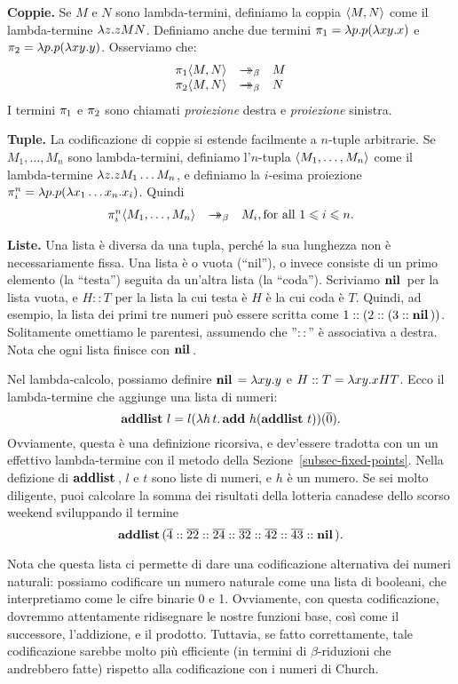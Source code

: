 \documentclass{article}
\begin{document}
{\bf Coppie.} Se $M$ e $N$ sono lambda-termini, definiamo la coppia
$\langle M,N\rangle$ come il lambda-termine $\lambda z.zMN$. Definiamo anche due
termini $\pi_1=\lambda p.p(\lambda xy.x)$ e $\pi_2=\lambda p.p(\lambda xy.y)$.
Osserviamo che:
\[  \begin{array}{rcl}
  \leftt \pair{M,N} &\redbs& M \\
  \rightt \pair{M,N} &\redbs& N
\end{array}
\]
I termini $\pi_1$ e $\pi_2$ sono chiamati {\em proiezione} destra e
{\em proiezione} sinistra.

{\bf Tuple.} La codificazione di coppie si estende facilmente a $n$-tuple
arbitrarie. Se $M_1,\ldots,M_n$ sono lambda-termini, definiamo l'$n$-tupla
$\langle M_1,\ldots,M_n\rangle$ come il lambda-termine $\lambda z.zM_1\ldots M_n$,
e definiamo la $i$-esima proiezione $\pi^n_i=\lambda p.p(\lambda x_1\ldots
x_n.x_i)$. Quindi
\[ \begin{array}{rcl}
  \pi^n_i\langle M_1,\ldots,M_n\rangle &\mathrel{\rightarrow\!\!\!\!\!\rightarrow}_{\beta}& M_i, \mbox{for all $1\leqslant i\leqslant n$.}
\end{array}
\]

{\bf Liste.} Una lista \`e diversa da una tupla, perch\'e la sua lunghezza non \`e
necessariamente fissa. Una lista \`e o vuota (``nil''), o invece
consiste di un primo elemento (la ``testa'') seguita da un'altra lista
(la ``coda''). Scriviamo $\mathop{\textbf{\bf nil}\,}$ per la lista vuota, e $H::T$ per la
lista la cui testa \`e $H$ \`e la cui coda \`e $T$. Quindi, ad esempio,
la lista dei primi tre numeri pu\`o essere scritta come
$1::(2::(3::\mathop{\textbf{\bf nil}\,}))$. Solitamente omettiamo le parentesi, assumendo
che ''$::$'' \`e associativa a destra. Nota che ogni lista
finisce con $\mathop{\textbf{\bf nil}\,}$.

Nel lambda-calcolo, possiamo definire $\mathop{\textbf{\bf nil}\,}=\lambda xy.y$ e $H::T =
\lambda xy.xHT$. Ecco il lambda-termine che aggiunge una lista di numeri:
\[ \mathop{\textbf{\bf addlist}\,} l = l(\lambda h\,t.\mathop{\textbf{\bf add}\,} h(\mathop{\textbf{\bf addlist}\,} t))(\mathop{\overline{0}}).
\]
Ovviamente, questa \`e una definizione ricorsiva, e dev'essere tradotta
con un un effettivo lambda-termine con il metodo della Sezione~\ref{subsec-fixed-points}.
Nella defizione di $\mathop{\textbf{\bf addlist}\,}$, $l$ e $t$ sono liste di numeri,
e $h$ \`e un numero. Se sei molto diligente, puoi calcolare la somma dei
risultati della lotteria canadese dello scorso weekend sviluppando il termine
\[ \mathop{\textbf{\bf addlist}\,} (\mathop{\overline{4}}::\mathop{\overline{22}}::\mathop{\overline{24}}::\mathop{\overline{32}}::\mathop{\overline{42}}::\mathop{\overline{43}}::\mathop{\textbf{\bf nil}\,}).
\]

Nota che questa lista ci permette di dare una codificazione alternativa
dei numeri naturali: possiamo codificare un numero naturale come una lista
di booleani, che interpretiamo come le cifre binarie 0 e 1. Ovviamente,
con questa codificazione, dovremmo attentamente ridisegnare le nostre
funzioni base, cos\`i come il successore, l'addizione, e il prodotto. Tuttavia,
se fatto correttamente, tale codificazione sarebbe molto pi\`u efficiente (in
termini di $\beta$-riduzioni che andrebbero fatte) rispetto alla codificazione
con i numeri di Church.
\end{document}
